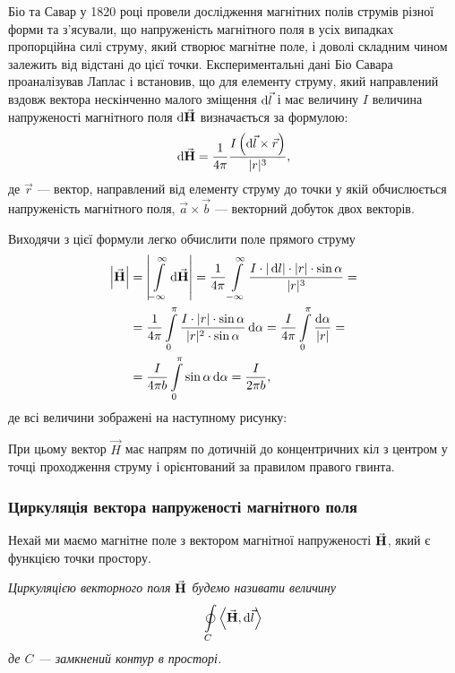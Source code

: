 Біо та Савар у 1820 році провели дослідження магнітних полів струмів різної форми та з'ясували, що напруженість магнітного поля в усіх випадках пропорційна силі струму, який створює магнітне поле, і доволі складним чином залежить від відстані до цієї точки. Експериментальні дані Біо Савара проаналізував Лаплас і встановив, що для елементу струму, який направлений вздовж вектора нескінченно малого зміщення $\mathop{}\!\mathrm{d} \vec l$ і має величину $I$ величина напруженості магнітного поля $\mathop{}\!\mathrm{d} {\vec{\mathbf{H}}}$ визначається за формулою:
\begin{equation}
	\mathop{}\!\mathrm{d} {\vec{\mathbf{H}}} = \frac{1}{4 \pi} \frac{I \left(\mathop{}\!\mathrm{d} \vec l \times \vec r\right)}{|r|^3},
\end{equation}
де $\vec r$ --- вектор, направлений від елементу струму до точки у якій обчислюється напруженість магнітного поля, $\vec a \times \vec b$ --- векторний добуток двох векторів.  \medskip

Виходячи з цієї формули легко обчислити поле прямого струму
\begin{equation}
	\begin{aligned}
		\left| {\vec{\mathbf{H}}} \right| &= \left| \displaystyle\int\limits_{-\infty}^\infty \mathop{}\!\mathrm{d} {\vec{\mathbf{H}}} \right| = \frac{1}{4\pi} \displaystyle\int\limits_{-\infty}^\infty \frac{I \cdot |\mathop{}\!\mathrm{d} l| \cdot |r| \cdot \sin \alpha}{|r|^3} = \\
		&= \frac{1}{4\pi} \displaystyle\int\limits_0^\pi \frac{I \cdot |r| \cdot \sin \alpha}{|r|^2 \cdot \sin \alpha} \mathop{}\!\mathrm{d} \alpha = \frac{I}{4\pi} \displaystyle\int\limits_0^\pi \frac{\mathop{}\!\mathrm{d} \alpha}{|r|} = \\
		&= \frac{I}{4\pi b} \displaystyle\int\limits_0^\pi \sin \alpha \mathop{}\!\mathrm{d} \alpha = \frac{I}{2\pi b},
	\end{aligned}
\end{equation}
де всі величини зображені на наступному рисунку:
\begin{figure}[H]
	\centering
\end{figure}

При цьому вектор $\vec H$ має напрям по дотичній до концентричних кіл з центром у точці проходження струму і орієнтований за правилом правого гвинта.

\subsubsection{Циркуляція вектора напруженості магнітного поля}

Нехай ми маємо магнітне поле з вектором магнітної напруженості ${\vec{\mathbf{H}}}$, який є функцією точки простору. 

\begin{definition}
	\it{Циркуляцією} векторного поля ${\vec{\mathbf{H}}}$ будемо називати величину
	\begin{equation}
		\Oint_C \langle \vecf H, \diff \vec l \rangle
	\end{equation}
	де $C$ --- замкнений контур в просторі. 
\end{definition}

